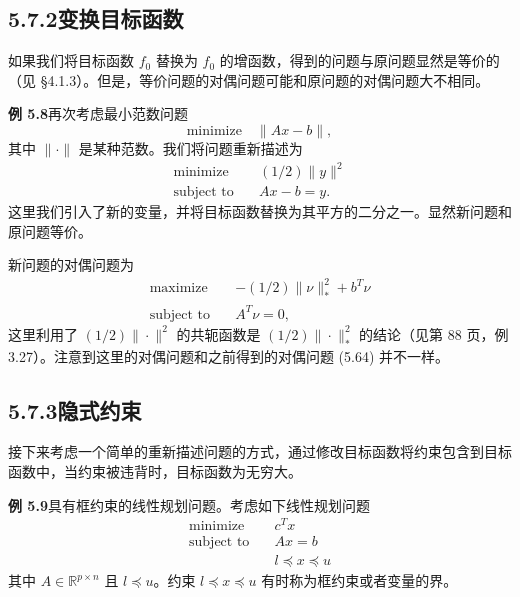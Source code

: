 \documentclass[UTF8,12pt,a4paper,fontset=fandol]{ctexart}
\begin{document}
\subsection*{5.7.2\quad 变换目标函数}

如果我们将目标函数 $f_0$ 替换为 $f_0$ 的增函数，得到的问题与原问题显然是等价的（见 §4.1.3）。但是，等价问题的对偶问题可能和原问题的对偶问题大不相同。

\noindent\textbf{例 5.8}\quad 再次考虑最小范数问题
\[
\text{minimize}\quad \|Ax-b\|,
\]
其中 $\|\cdot\|$ 是某种范数。我们将问题重新描述为
\[
\begin{aligned}
\text{minimize}\quad & (1/2)\|y\|^2\\
\text{subject to}\quad & Ax-b=y.
\end{aligned}
\]
这里我们引入了新的变量，并将目标函数替换为其平方的二分之一。显然新问题和原问题等价。

新问题的对偶问题为
\[
\begin{aligned}
\text{maximize}\quad & -(1/2)\|\nu\|_\ast^2+b^T\nu\\
\text{subject to}\quad & A^T\nu=0,
\end{aligned}
\]
这里利用了 $(1/2)\|\cdot\|^2$ 的共轭函数是 $(1/2)\|\cdot\|_\ast^2$ 的结论（见第 88 页，例 3.27）。注意到这里的对偶问题和之前得到的对偶问题 (5.64) 并不一样。

\subsection*{5.7.3\quad 隐式约束}

接下来考虑一个简单的重新描述问题的方式，通过修改目标函数将约束包含到目标函数中，当约束被违背时，目标函数为无穷大。

\noindent\textbf{例 5.9}\quad 具有框约束的线性规划问题。考虑如下线性规划问题
\begin{equation}
\begin{aligned}
\text{minimize}\quad & c^Tx\\
\text{subject to}\quad & Ax=b\\
& l\preceq x\preceq u
\end{aligned}
\tag{5.68}
\end{equation}
其中 $A\in\mathbb{R}^{p\times n}$ 且 $l\preceq u$。约束 $l\preceq x\preceq u$ 有时称为框约束或者变量的界。
\end{document}
